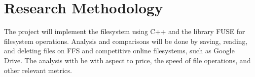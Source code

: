 
\section{Research Methodology}%

The project will implement the filesystem using C++ and the library FUSE\cite{Libfuse2021} for filesystem operations. Analysis and comparisons will be done by saving, reading, and deleting files on FFS and competitive online filesystems, such as Google Drive. The analysis with be with aspect to price, the speed of file operations, and other relevant metrics.